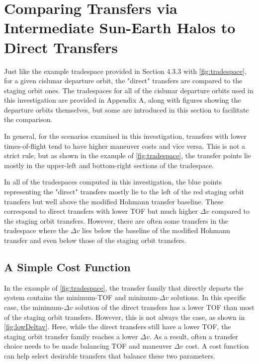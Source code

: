 \section{Comparing Transfers via Intermediate Sun-Earth Halos to Direct Transfers}
Just like the example tradespace provided in Section 4.3.3 with \cref{fig:tradespace}, for a given
cislunar departure orbit, the "direct" transfers are compared to the staging orbit ones. The
tradespaces for all of the cislunar departure orbits used in this investigation are provided in
Appendix A, along with figures showing the departure orbits themselves, but some are introduced in
this section to facilitate the comparison.

In general, for the scenarios examined in this investigation, transfers with lower times-of-flight
tend to have higher maneuver costs and vice versa. This is not a strict rule, but as shown in the
example of \cref{fig:tradespace}, the transfer points lie mostly in the upper-left and bottom-right
sections of the tradespace. 

In all of the tradespaces computed in this investigation, the blue points representing the "direct"
transfers mostly lie to the left of the red staging orbit transfers but well above the modified
Hohmann transfer baseline. These correspond to direct transfers with lower TOF but much higher
$\Delta v$ compared to the staging orbit transfers. However, there are often some transfers in the
tradespace where the $\Delta v$ lies below the baseline of the modified Hohmann transfer and even
below those of the staging orbit transfers.

\subsection{A Simple Cost Function}
In the example of \cref{fig:tradespace}, the transfer family that directly departs the system
contains the minimum-TOF and minimum-$\Delta v$ solutions. In this specific case, the
minimum-$\Delta v$ solution of the direct transfers has a lower TOF than most of the staging orbit
transfers. However, this is not always the case, as shown in \cref{fig:lowDeltav}. Here, while the
direct transfers still have a lower TOF, the staging orbit transfer family reaches a lower
$\Delta v$. As a result, often a transfer choice needs to be made balancing TOF and maneuver
$\Delta v$ cost. A cost function can help select desirable transfers that balance these two
parameters.

